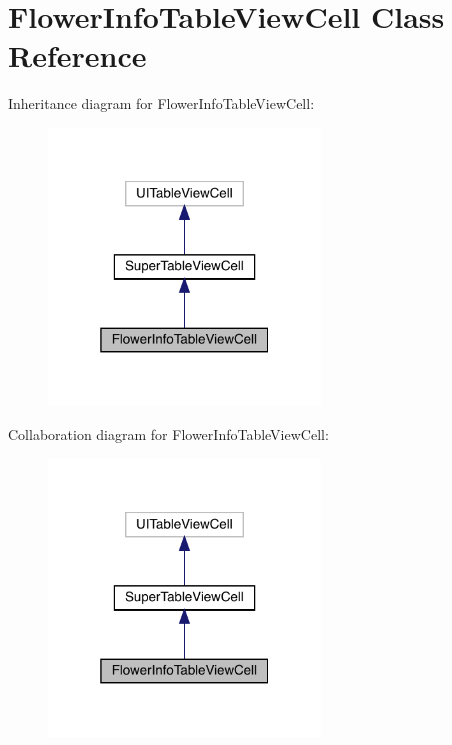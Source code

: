 \hypertarget{interface_flower_info_table_view_cell}{}\section{Flower\+Info\+Table\+View\+Cell Class Reference}
\label{interface_flower_info_table_view_cell}


Inheritance diagram for Flower\+Info\+Table\+View\+Cell\+:\nopagebreak
\begin{figure}[H]
\begin{center}
\leavevmode
\includegraphics[width=205pt]{interface_flower_info_table_view_cell__inherit__graph}
\end{center}
\end{figure}


Collaboration diagram for Flower\+Info\+Table\+View\+Cell\+:\nopagebreak
\begin{figure}[H]
\begin{center}
\leavevmode
\includegraphics[width=205pt]{interface_flower_info_table_view_cell__coll__graph}
\end{center}
\end{figure}
